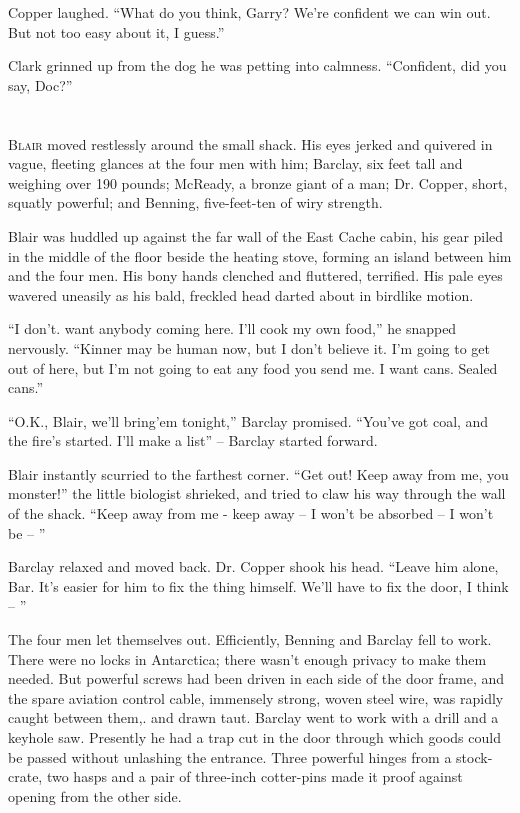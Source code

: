 \documentclass[letterpaper,openany,12pt]{memoir}		%
\begin{document}
Copper laughed. ``What do you think, Garry? We're confident we can win out. But
not too easy about it, I guess.''

Clark grinned up from the dog he was petting into calmness. ``Confident, did you
say, Doc?''


\chapter[Chapter 8]{}

\lettrine[lines=3,findent=2pt,nindent=2pt]{B}{lair} moved restlessly around the
small shack. His eyes jerked and quivered in vague, fleeting glances at the four
men with him; Barclay, six feet tall and weighing over 190 pounds; McReady, a
bronze giant of a man; Dr. Copper, short, squatly powerful; and Benning,
five-feet-ten of wiry strength.

Blair was huddled up against the far wall of the East Cache cabin, his gear
piled in the middle of the floor beside the heating stove, forming an island
between him and the four men. His bony hands clenched and fluttered, terrified.
His pale eyes wavered uneasily as his bald, freckled head darted about in
birdlike motion.

``I don't. want anybody coming here. I'll cook my own food,'' he snapped
nervously. ``Kinner may be human now, but I don't believe it. I'm going to get
out of here, but I'm not going to eat any food you send me. I want cans. Sealed
cans.''

``O.K., Blair, we'll bring'em tonight,'' Barclay promised. ``You've got coal,
and the fire's started. I'll make a list'' -- Barclay started forward.

Blair instantly scurried to the farthest corner. ``Get out! Keep away from me,
you monster!'' the little biologist shrieked, and tried to claw his way through
the wall of the shack. ``Keep away from me - keep away -- I won't be absorbed --
I won't be -- ''

Barclay relaxed and moved back. Dr. Copper shook his head. ``Leave him alone,
Bar. It's easier for him to fix the thing himself. We'll have to fix the door, I
think -- ''

The four men let themselves out. Efficiently, Benning and Barclay fell to work.
There were no locks in Antarctica; there wasn't enough privacy to make them
needed. But powerful screws had been driven in each side of the door frame, and
the spare aviation control cable, immensely strong, woven steel wire, was
rapidly caught between them,. and drawn taut. Barclay went to work with a drill
and a keyhole saw. Presently he had a trap cut in the door through which goods
could be passed without unlashing the entrance. Three powerful hinges from a
stock-crate, two hasps and a pair of three-inch cotter-pins made it proof
against opening from the other side.
\end{document}
